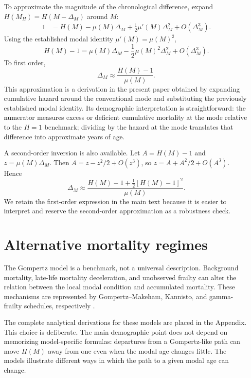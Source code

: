 \documentclass[doublespace]{interact}
\begin{document}
To approximate the magnitude of the chronological difference, expand $H(M_H)=H(M-\Delta_M)$ around $M$:
\begin{align}
1
&=H(M)-\mu(M)\Delta_M+\frac{1}{2}\mu'(M)\Delta_M^2+O(\Delta_M^3).
\end{align}
Using the established modal identity $\mu'(M)=\mu(M)^2$,
\begin{equation}
H(M)-1
=\mu(M)\Delta_M-\frac{1}{2}\mu(M)^2\Delta_M^2+O(\Delta_M^3).
\end{equation}
To first order,
\begin{equation}
\boxed{\Delta_M\approx\frac{H(M)-1}{\mu(M)}.}
\end{equation}
This approximation is a derivation in the present paper obtained by expanding cumulative hazard around the conventional mode and substituting the previously established modal identity. Its demographic interpretation is straightforward: the numerator measures excess or deficient cumulative mortality at the mode relative to the $H=1$ benchmark; dividing by the hazard at the mode translates that difference into approximate years of age.

A second-order inversion is also available. Let $A=H(M)-1$ and $z=\mu(M)\Delta_M$. Then $A=z-z^2/2+O(z^3)$, so $z=A+A^2/2+O(A^3)$. Hence
\begin{equation}
\Delta_M\approx\frac{H(M)-1+\frac12[H(M)-1]^2}{\mu(M)}.
\end{equation}
We retain the first-order expression in the main text because it is easier to interpret and reserve the second-order approximation as a robustness check.

\section{Alternative mortality regimes}

The Gompertz model is a benchmark, not a universal description. Background mortality, late-life mortality deceleration, and unobserved frailty can alter the relation between the local modal condition and accumulated mortality. These mechanisms are represented by Gompertz--Makeham, Kannisto, and gamma-frailty schedules, respectively \citep{ThatcherKannistoVaupel1998,VaupelMantonStallard1979,VaupelYashin1985,Missov2013,CastellaresEtAl2020}.

The complete analytical derivations for these models are placed in the Appendix. This choice is deliberate. The main demographic point does not depend on memorizing model-specific formulas: departures from a Gompertz-like path can move $H(M)$ away from one even when the modal age changes little. The models illustrate different ways in which the path to a given modal age can change.
\end{document}
